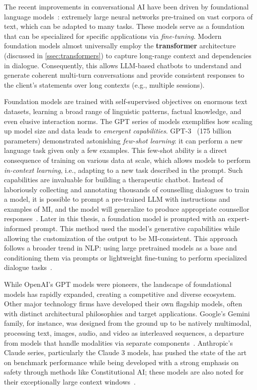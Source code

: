 The recent improvements in conversational AI have been driven by foundational language models~\cite{stanfordCRFM2021}: extremely large neural networks pre-trained on vast corpora of text, which can be adapted to many tasks. These models serve as a foundation that can be specialized for specific applications via \emph{fine-tuning}. Modern foundation models almost universally employ the \textbf{transformer} architecture (discussed in \cref{ssec:transformers}) to capture long-range context and dependencies in dialogue. Consequently, this allows LLM-based chatbots to understand and generate coherent multi-turn conversations and provide consistent responses to the client's statements over long contexts (e.g., multiple sessions).

Foundation models are trained with self-supervised objectives on enormous text datasets, learning a broad range of linguistic patterns, factual knowledge, and even elusive interaction norms. The GPT series of models exemplifies how scaling up model size and data leads to \emph{emergent capabilities}. GPT-3~\cite{brown2020language} (175 billion parameters) demonstrated astonishing \emph{few-shot learning}: it can perform a new language task given only a few examples. This few-shot ability is a direct consequence of training on various data at scale, which allows models to perform \emph{in-context learning}, i.e., adapting to a new task described in the prompt. Such capabilities are invaluable for building a therapeutic chatbot. Instead of laboriously collecting and annotating thousands of counselling dialogues to train a model, it is possible to prompt a pre-trained LLM with instructions and examples of MI, and the model will generalize to produce appropriate counsellor responses~\cite{xie-etal-2024-shot-dialogue}. Later in this thesis, a foundation model is prompted with an expert-informed prompt. This method used the model's generative capabilities while allowing the customization of the output to be MI-consistent. This approach follows a broader trend in NLP: using large pretrained models as a base and conditioning them via prompts or lightweight fine-tuning to perform specialized dialogue tasks~\cite{10.5555/3600270.3602070}.

While OpenAI's GPT models were pioneers, the landscape of foundational models has rapidly expanded, creating a competitive and diverse ecosystem. Other major technology firms have developed their own flagship models, often with distinct architectural philosophies and target applications. Google's Gemini family, for instance, was designed from the ground up to be natively multimodal, processing text, images, audio, and video as interleaved sequences, a departure from models that handle modalities via separate components~\cite{team2023gemini}. Anthropic's Claude series, particularly the Claude 3 models, has pushed the state of the art on benchmark performance while being developed with a strong emphasis on safety through methods like Constitutional AI; these models are also noted for their exceptionally large context windows~\cite{anthropic2024claude}.

